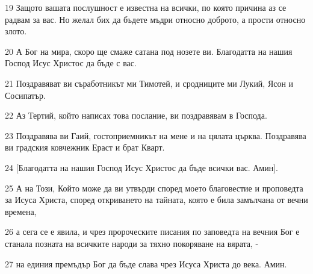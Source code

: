 \par 19 Защото вашата послушност е известна на всички, по която причина аз се радвам за вас. Но желал бих да бъдете мъдри относно доброто, а прости относно злото.
\par 20 А Бог на мира, скоро ще смаже сатана под нозете ви. Благодатта на нашия Господ Исус Христос да бъде с вас.
\par 21 Поздравяват ви съработникът ми Тимотей, и сродниците ми Лукий, Ясон и Сосипатър.
\par 22 Аз Тертий, който написах това послание, ви поздравявам в Господа.
\par 23 Поздравява ви Гаий, гостоприемникът на мене и на цялата църква. Поздравява ви градския ковчежник Ераст и брат Кварт.
\par 24 [Благодатта на нашия Господ Исус Христос да бъде всички вас. Амин].
\par 25 А на Този, Който може да ви утвърди според моето благовестие и проповедта за Исуса Христа, според откриването на тайната, която е била замълчана от вечни времена,
\par 26 а сега се е явила, и чрез пророческите писания по заповедта на вечния Бог е станала позната на всичките народи за тяхно покоряване на вярата, -
\par 27 на единия премъдър Бог да бъде слава чрез Исуса Христа до века. Амин.


